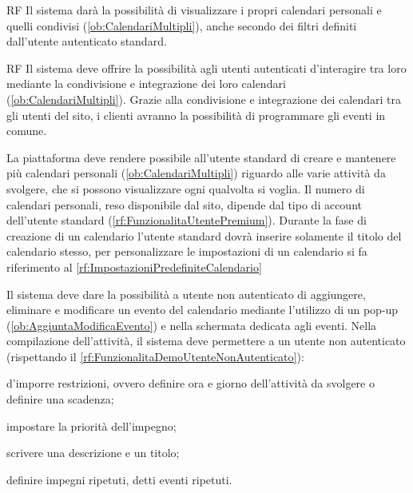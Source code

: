 \begin{listaPersonale}{RF}
	 Il sistema darà la possibilità di visualizzare i propri calendari personali e quelli condivisi (\ref{ob:CalendariMultipli}), anche secondo dei filtri definiti dall'utente autenticato standard.
	\begin{listaPersonale2}{RF}
		 Il sistema deve offrire la possibilità agli utenti autenticati d'interagire tra loro mediante la condivisione e integrazione dei loro calendari (\ref{ob:CalendariMultipli}). Grazie alla condivisione e integrazione dei calendari tra gli utenti del sito, i clienti avranno la possibilità di programmare gli eventi in comune.

		 La piattaforma deve rendere possibile all'utente standard di creare e mantenere più calendari personali (\ref{ob:CalendariMultipli}) riguardo alle varie attività da svolgere, che si possono visualizzare ogni qualvolta si voglia. Il numero di calendari personali, reso disponibile dal sito, dipende dal tipo di account dell'utente standard (\ref{rf:FunzionalitaUtentePremium}). Durante la fase di creazione di un calendario l'utente standard dovrà inserire solamente il titolo del calendario stesso, per personalizzare le impostazioni di un calendario si fa riferimento al \ref{rf:ImpostazioniPredefiniteCalendario}
	\end{listaPersonale2}

	 Il sistema deve dare la possibilità a utente non autenticato di aggiungere, eliminare e modificare un evento del calendario mediante l'utilizzo di un pop-up (\ref{ob:AggiuntaModificaEvento}) e nella schermata dedicata agli eventi. Nella compilazione dell'attività, il sistema deve permettere a un utente non autenticato (rispettando il \ref{rf:FunzionalitaDemoUtenteNonAutenticato}):
	\begin{listaPersonale2}[RF]{}
		 d'imporre restrizioni, ovvero definire ora e giorno dell'attività da svolgere o definire una scadenza;

		 impostare la priorità dell'impegno;

		 scrivere una descrizione e un titolo;

		 definire impegni ripetuti, detti eventi ripetuti.


\end{listaPersonale2}
\end{listaPersonale}
